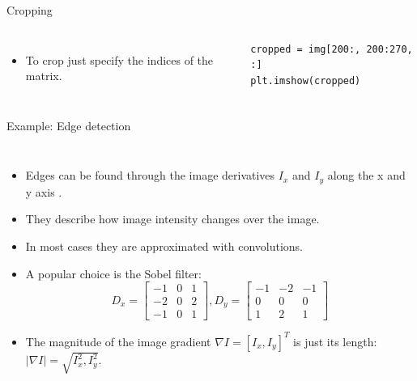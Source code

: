\documentclass[compress%
,aspectratio=169%
]{beamer}
\begin{document}
\begin{frame}[fragile]{Cropping}

\begin{columns}
 \begin{itemize}
    \item To crop just specify the indices of the matrix.
\end{itemize}
\begin{lstlisting}
cropped = img[200:, 200:270, :]
plt.imshow(cropped)
\end{lstlisting}
 \centering
\end{columns}
\end{frame}


\begin{frame}{Example: Edge detection}

\begin{columns}
\begin{itemize}
        \small
        \item Edges can be found through the image derivatives $I_x$ and $I_y$ along the x and y axis .
        \item They describe how image intensity changes over the image.
        \item In most cases they are approximated with convolutions.
        \item A popular choice is the Sobel filter:
        {\footnotesize \begin{equation*}
D_x = 
\begin{bmatrix}
-1 & 0 & 1\\
-2 & 0 & 2 \\
-1 & 0 & 1
\end{bmatrix}, 
D_y = 
\begin{bmatrix}
-1 & -2 & -1\\
0 & 0 & 0 \\
1 & 2 & 1
\end{bmatrix}
\end{equation*}}
    \item The magnitude of the image gradient $\nabla I = [I_x, I_y]^T$ is just its length: 
$|\nabla I| = \sqrt{I_{x}^{2}, I_{y}^{2}}$.
\end{itemize}

 \end{columns}
\end{frame}
\end{document}
